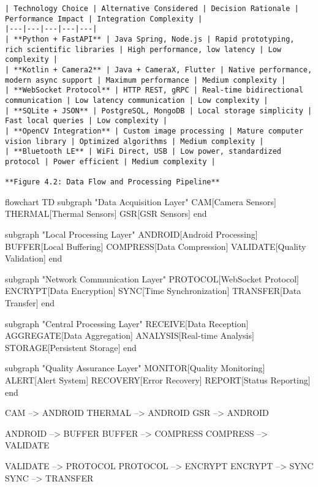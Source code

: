\documentclass[12pt,a4paper]{report}
\begin{document}
\begin{itemize}
\begin{verbatim}
| Technology Choice | Alternative Considered | Decision Rationale | Performance Impact | Integration Complexity |
|---|---|---|---|---|
| **Python + FastAPI** | Java Spring, Node.js | Rapid prototyping, rich scientific libraries | High performance, low latency | Low complexity |
| **Kotlin + Camera2** | Java + CameraX, Flutter | Native performance, modern async support | Maximum performance | Medium complexity |
| **WebSocket Protocol** | HTTP REST, gRPC | Real-time bidirectional communication | Low latency communication | Low complexity |
| **SQLite + JSON** | PostgreSQL, MongoDB | Local storage simplicity | Fast local queries | Low complexity |
| **OpenCV Integration** | Custom image processing | Mature computer vision library | Optimized algorithms | Medium complexity |
| **Bluetooth LE** | WiFi Direct, USB | Low power, standardized protocol | Power efficient | Medium complexity |

**Figure 4.2: Data Flow and Processing Pipeline**

\end{verbatim}
\end{itemize}
flowchart TD
    subgraph "Data Acquisition Layer"
        CAM[Camera Sensors]
        THERMAL[Thermal Sensors] 
        GSR[GSR Sensors]
    end
    
    subgraph "Local Processing Layer"
        ANDROID[Android Processing]
        BUFFER[Local Buffering]
        COMPRESS[Data Compression]
        VALIDATE[Quality Validation]
    end
    
    subgraph "Network Communication Layer"
        PROTOCOL[WebSocket Protocol]
        ENCRYPT[Data Encryption]
        SYNC[Time Synchronization]
        TRANSFER[Data Transfer]
    end
    
    subgraph "Central Processing Layer"
        RECEIVE[Data Reception]
        AGGREGATE[Data Aggregation]
        ANALYSIS[Real-time Analysis]
        STORAGE[Persistent Storage]
    end
    
    subgraph "Quality Assurance Layer"
        MONITOR[Quality Monitoring]
        ALERT[Alert System]
        RECOVERY[Error Recovery]
        REPORT[Status Reporting]
    end
    
    CAM --> ANDROID
    THERMAL --> ANDROID
    GSR --> ANDROID
    
    ANDROID --> BUFFER
    BUFFER --> COMPRESS
    COMPRESS --> VALIDATE
    
    VALIDATE --> PROTOCOL
    PROTOCOL --> ENCRYPT
    ENCRYPT --> SYNC
    SYNC --> TRANSFER
    
\end{document}
